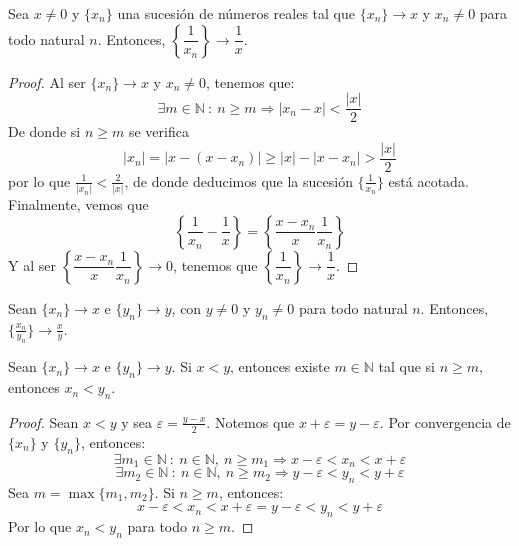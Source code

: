 \begin{prop}
    Sea $x \neq 0$ y $\{x_n\}$ una sucesión de números reales tal que $\{x_n\} \longrightarrow x$ y $x_n \neq 0$ para todo natural $n$. Entonces, $\left\{\dfrac{1}{x_n}\right\} \longrightarrow \dfrac{1}{x}$.
\end{prop}
\begin{proof}
    Al ser $\{x_n\} \longrightarrow x$ y $x_n \neq 0$, tenemos que:
    \begin{equation*}
        \exists m \in \mathbb{N} ~:~ n \geq m \Longrightarrow |x_n-x| < \frac{|x|}{2}
    \end{equation*}
    De donde si $n \geq m$ se verifica
    \begin{equation*}
        |x_n| = |x-(x-x_n)| \geq |x| - |x - x_n| > \frac{|x|}{2}
    \end{equation*}
    por lo que $\frac{1}{|x_n|} < \frac{2}{|x|}$, de donde deducimos que la sucesión $\{\frac{1}{x_n}\}$ está acotada.
    Finalmente, vemos que
    \begin{equation*}
        \left\{\frac{1}{x_n} - \frac{1}{x}\right\}=\left\{\frac{x-x_n}{x} \frac{1}{x_n}\right\}
    \end{equation*}
    Y al ser $\left\{\dfrac{x-x_n}{x} \dfrac{1}{x_n}\right\} \longrightarrow 0$, tenemos que $\left\{\dfrac{1}{x_n}\right\} \longrightarrow \dfrac{1}{x}$.
\end{proof}

\begin{coro}
    Sean $\{x_n\} \longrightarrow x$ e $\{y_n\} \longrightarrow y$, con $y \neq 0$ y $y_n \neq 0$ para todo natural $n$. Entonces, $\{\frac{x_n}{y_n}\} \longrightarrow \frac{x}{y}$.
\end{coro}

\begin{prop}
    Sean $\{x_n\} \longrightarrow x$ e $\{y_n\} \longrightarrow y$. Si $x < y$, entonces existe $m \in \mathbb{N}$ tal que si $n \geq m$, entonces $x_n < y_n$.
\end{prop}
\begin{proof}
    Sean $x < y$ y sea $\varepsilon = \frac{y-x}{2}$. Notemos que $x+\varepsilon = y-\varepsilon$.
    Por convergencia de $\{x_n\}$ y $\{y_n\}$, entonces:
    \begin{equation*}
        \exists m_1 \in \mathbb{N} ~:~ n \in \mathbb{N}, ~n \geq m_1 \Longrightarrow x-\varepsilon < x_n < x+\varepsilon
    \end{equation*}
    \begin{equation*}
        \exists m_2 \in \mathbb{N} ~:~ n \in \mathbb{N}, ~n \geq m_2 \Longrightarrow y-\varepsilon < y_n < y+\varepsilon
    \end{equation*}
    Sea $m = \max \{m_1, m_2\}$. Si $n \geq m$, entonces:
    \begin{equation*}
        x-\varepsilon < x_n < x+\varepsilon = y-\varepsilon < y_n < y+\varepsilon
    \end{equation*}
    Por lo que $x_n < y_n$ para todo $n \geq m$.
\end{proof}

